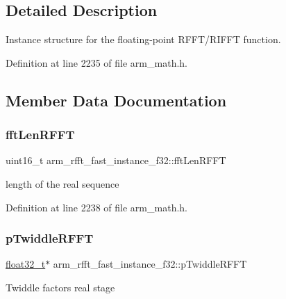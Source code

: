 \subsection{Detailed Description}
Instance structure for the floating-\/point R\+F\+F\+T/\+R\+I\+F\+FT function. 

Definition at line 2235 of file arm\+\_\+math.\+h.



\subsection{Member Data Documentation}
\mbox{\label{structarm__rfft__fast__instance__f32_aef06ab665041ec36f5b25d464f0cab14}} 
\subsubsection{\texorpdfstring{fft\+Len\+R\+F\+FT}{fftLenRFFT}}
{\footnotesize\ttfamily uint16\+\_\+t arm\+\_\+rfft\+\_\+fast\+\_\+instance\+\_\+f32\+::fft\+Len\+R\+F\+FT}

length of the real sequence 

Definition at line 2238 of file arm\+\_\+math.\+h.

\mbox{\label{structarm__rfft__fast__instance__f32_a9f30b04f163fabc1b24421d3c323d5fc}} 
\subsubsection{\texorpdfstring{p\+Twiddle\+R\+F\+FT}{pTwiddleRFFT}}
{\footnotesize\ttfamily \hyperlink{arm__math_8h_a4611b605e45ab401f02cab15c5e38715}{float32\+\_\+t}$\ast$ arm\+\_\+rfft\+\_\+fast\+\_\+instance\+\_\+f32\+::p\+Twiddle\+R\+F\+FT}

Twiddle factors real stage 

